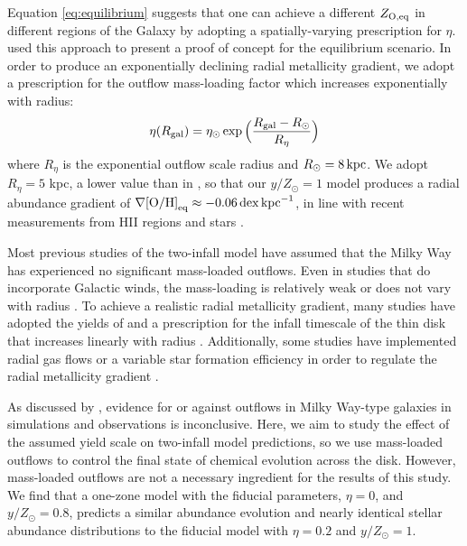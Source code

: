 \documentclass[twocolumn,twocolappendix,linenumbers]{aastex631}
\newcommand{\mathOH}{{\rm [O/H]}}
\newcommand{\yZ}[1]{$y/Z_\odot=#1$}
\newcommand{\kpc}{\,{\rm kpc}}
\begin{document}
Equation \ref{eq:equilibrium} suggests that one can achieve a different $Z_{\rm O,eq}$ in different regions of the Galaxy by adopting a spatially-varying prescription for $\eta$. \citet{johnson_milky_2024} used this approach to present a proof of concept for the equilibrium scenario. In order to produce an exponentially declining radial metallicity gradient, we adopt a prescription for the outflow mass-loading factor which increases exponentially with radius:
\begin{equation}
    \eta(R_{\rm gal}) = \eta_\odot \exp\Big(\frac{R_{\rm gal}-R_\odot}{R_\eta}\Big)
\end{equation}
where $R_\eta$ is the exponential outflow scale radius and $R_\odot=8\kpc$. We adopt $R_\eta=5$ kpc, a lower value than in \citet{johnson_milky_2024}, so that our $y/Z_\odot=1$ model produces a radial abundance gradient of $\nabla\mathOH_{\rm eq}\approx-0.06\,{\rm dex}\kpc^{-1}$, in line with recent measurements from HII regions \citep{mendez-delgado_gradients_2022} and stars \citep{myers_open_2022,johnson_milky_2024}.

Most previous studies of the two-infall model have assumed that the Milky Way has experienced no significant mass-loaded outflows. Even in studies that do incorporate Galactic winds, the mass-loading is relatively weak \citep[e.g., $\eta\approx0.2$ in][]{palicio_analytic_2023} or does not vary with radius \citep{hegedus_reconstructing_2025}. To achieve a realistic radial metallicity gradient, many studies have adopted the yields of \citet{francois_evolution_2004} and a prescription for the infall timescale of the thin disk that increases linearly with radius \citep[e.g.,][]{chiappini_chemical_1997,romano_mass_2000}. Additionally, some studies have implemented radial gas flows or a variable star formation efficiency in order to regulate the radial metallicity gradient \citep[e.g.,][]{spitoni_effects_2011,palla_chemical_2020}.

As discussed by \citet{johnson_milky_2024}, evidence for or against outflows in Milky Way-type galaxies in simulations and observations is inconclusive. Here, we aim to study the effect of the assumed yield scale on two-infall model predictions, so we use mass-loaded outflows to control the final state of chemical evolution across the disk. However, mass-loaded outflows are not a necessary ingredient for the results of this study. We find that a one-zone model with the fiducial parameters, $\eta=0$, and \yZ{0.8}, predicts a similar abundance evolution and nearly identical stellar abundance distributions to the fiducial model with $\eta=0.2$ and \yZ{1}.
\end{document}
